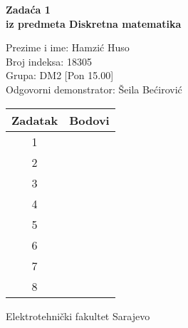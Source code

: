 \documentclass[12pt]{article}
\newcommand{\prezimeIme}{Hamzić Huso}
\newcommand{\brIndexa}{18305}
\newcommand{\brZadace}{1}
\newcommand{\grupa}{DM2 [Pon 15.00]}
\newcommand{\demos}{Šeila Bećirović}
\begin{document}
    
    \thispagestyle{empty}
    \begin{center}
      \vspace*{1cm}

      \vspace*{2cm}
      {\huge \bf Zadaća \brZadace } \\
      \vspace*{1cm}
      {\Large \bf iz predmeta Diskretna matematika}

      \vspace*{2cm}

      {\Large Prezime i ime: \prezimeIme} \\
      \vspace*{0.75cm}
      {\Large Broj indeksa: \brIndexa} \\
      \vspace*{0.75cm}
      {\Large Grupa: \grupa} \\
      \vspace*{0.75cm}
      {\Large Odgovorni demonstrator: \demos} \\
      \vspace*{2cm}
      \renewcommand{\arraystretch}{1.75}
      \begin{tabular}{|c|c|}
    	\hline Zadatak & Bodovi \\
    	\hline 1 &  \\
    	\hline 2 &  \\
    	\hline 3 &  \\
    	\hline 4 &  \\
    	\hline 5 &  \\
    	\hline 6 &  \\
    	\hline 7 &  \\
    	\hline 8 &  \\
    	\hline
     \end{tabular}

      \vfill


      {\large Elektrotehnički fakultet Sarajevo}

    \end{center}
    \newpage
    \thispagestyle{empty}
    
\end{document}
